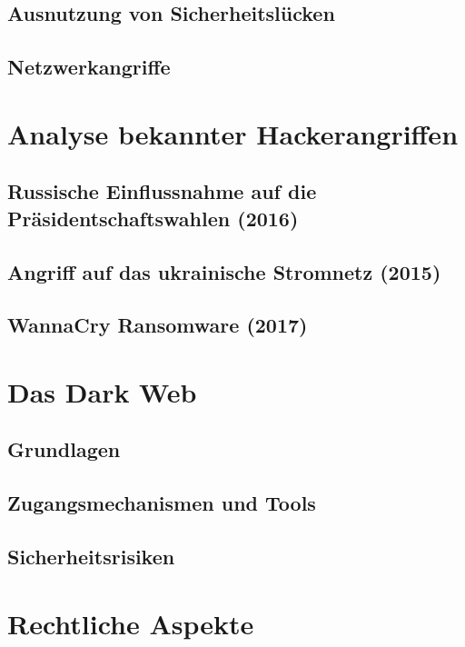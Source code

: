 \documentclass[12pt, a4paper]{article}
\begin{document}
\subsection{Ausnutzung von Sicherheitslücken}

\subsection{Netzwerkangriffe}


\section{Analyse bekannter Hackerangriffen}

\subsection{Russische Einflussnahme auf die Präsidentschaftswahlen (2016)}

\subsection{Angriff auf das ukrainische Stromnetz (2015)}

\subsection{WannaCry Ransomware (2017)}


\section{Das Dark Web}

\subsection{Grundlagen}

\subsection{Zugangsmechanismen und Tools}

\subsection{Sicherheitsrisiken}



\section{Rechtliche Aspekte}
\end{document}
